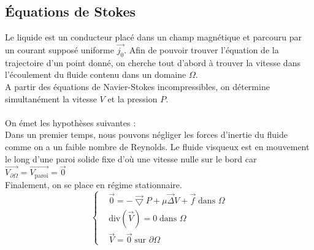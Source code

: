 \documentclass[a4paper,12pt,titlepage]{report}
\begin{document}
\begin{onehalfspace}
\subsection{Équations de Stokes}

Le liquide est un conducteur placé dans un champ magnétique et parcouru par un courant supposé uniforme $\vec{j_0}$.
\normalsize 
Afin de pouvoir trouver l'équation de la trajectoire d’un point donné, on cherche tout d’abord à trouver la vitesse dans l'écoulement du fluide contenu dans un domaine $\Omega$.
\\A partir des équations de Navier-Stokes incompressibles, on détermine simultanément la vitesse  $V$ et la pression $P$. 
\\
\\
On émet les hypothèses suivantes :
\\
Dans un premier temps, nous pouvons négliger les forces d’inertie du fluide comme on a un faible nombre de Reynolds.
Le fluide visqueux est en mouvement le long d’une paroi solide fixe d’où une vitesse nulle sur le bord car 
$\vec{V_{\partial\Omega}}=\vec{V_{\text{paroi}}}=\vec{0}$
\\	
Finalement, on se place en régime stationnaire.
\begin{equation*}
  \left\{
    \begin{aligned}
      &\vec{0}=-\vec{\bigtriangledown}P +\mu\vec{\Delta}V +\vec{f}\;\text{dans }\Omega \\
      &\text{div}(\vec{V})=0\;\text{dans }\Omega \\     
      &\vec{V}=\vec{0}\;\text{sur }\partial\Omega
    \end{aligned}
  \right.
\end{equation*}


\end{onehalfspace}
\end{document}
